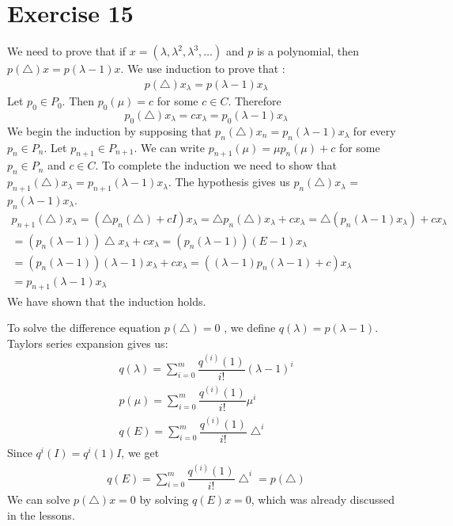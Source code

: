 \section{Exercise 15}
We need to prove that if $x = ( \lambda,\lambda^2 ,\lambda^3 ,\ldots ) $ and $p$ is a polynomial, then $p(\bigtriangleup)x= p(\lambda-1)x$.
We use induction to prove that :
\begin{gather*}
p(\bigtriangleup) x_{\lambda} = p(\lambda -1 ) x_{\lambda}
\end{gather*}
Let $p_0 \in P_0$. Then $p_0(\mu) = c$ for some $c \in C$. Therefore
\begin{equation*}
p_0 ( \bigtriangleup ) x_{\lambda} =  c x_{\lambda} = p_0 (\lambda -1 ) x_{\lambda}
\end{equation*}
We begin the induction by supposing that $p_n ( \bigtriangleup ) x_n = p_n(\lambda -1 ) x_{\lambda}$ for every $p_n \in P_n$. Let $p_{n+1} \in P_{n+1}$. We can write $p_{n+1}(\mu) = \mu p_n(\mu) + c$ for some $p_n \in P_n$ and $c \in C$. To complete the induction we need to show that $p_{n+1}(\bigtriangleup) x_{\lambda} = p_{n+1} (\lambda -1 ) x_{\lambda}$. The hypothesis gives us $p_n(\bigtriangleup) x_{\lambda} $ = $p_n (\lambda -1 )x_{\lambda}$.
\begin{gather*}
p_{n+1} ( \bigtriangleup ) x_{\lambda} = (\bigtriangleup p_n (\bigtriangleup) + cI) x_{\lambda} = \bigtriangleup p_n ( \bigtriangleup ) x_{\lambda} + cx_{\lambda} = \bigtriangleup(p_n(\lambda -1 ) x_{\lambda} ) + cx_{\lambda} \\
= (p_n(\lambda -1))\bigtriangleup x_{\lambda} + cx_{\lambda} = (p_n(\lambda -1))(E -1) x_{\lambda}\\
= (p_n (\lambda -1))(\lambda-1)x_{\lambda} + cx_{\lambda} = ((\lambda -1) p_n(\lambda -1) + c) x_{\lambda} \\
= p_{n+1}(\lambda -1) x_{\lambda}
\end{gather*}
We have shown that the induction holds.

To solve the difference equation $p(\bigtriangleup) = 0$ , we define $q(\lambda) = p(\lambda -1)$.
Taylors series expansion gives us:
\begin{gather*}
q(\lambda) = \sum\limits_{i=0}^m \dfrac{q^{(i)}(1)}{i!}(\lambda -1)^{i}\\
p(\mu) = \sum\limits_{i=0}^m \dfrac{q^{(i)}(1)}{i!} \mu^i \\
q(E) = \sum\limits_{i=0}^m \dfrac{q^{(i)}(1)}{i!} \bigtriangleup ^i
\end{gather*}
Since $q^i(I) = q^i(1)I$, we get
\begin{gather*}
q(E) = \sum\limits_{i=0}^m \dfrac{q^{(i)}(1)}{i!} \bigtriangleup ^i = p(\bigtriangleup)
\end{gather*}
We can solve $p (\bigtriangleup) x =0$ by solving $ q(E)x=0$, which was already discussed in the lessons.
